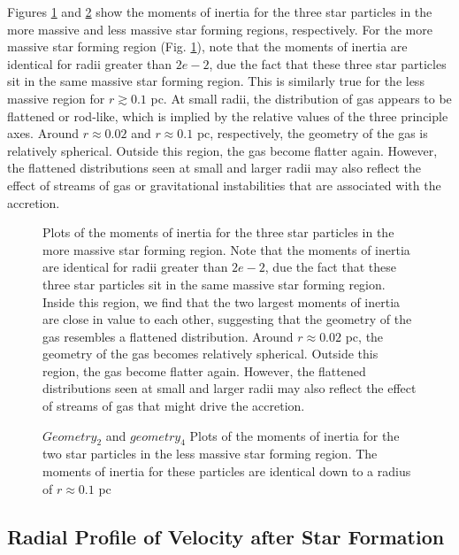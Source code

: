 \documentclass{emulateapj}
\begin{document}
Figures \ref{fig:geometry} and \ref{fig:geometry 2} show the moments of inertia for the three star particles in the more massive and less massive star forming regions, respectively.  For the more massive star forming region (Fig. \ref{fig:geometry}), note that the moments of inertia are identical for radii greater than $2e-2$, due the fact that these three star particles sit in the same massive star forming region. This is similarly true for the less massive region for $r\gtrsim 0.1$ pc.  At small radii, the distribution of gas appears to be flattened or rod-like, which is implied by the relative values of the three principle axes.  Around $r\approx 0.02$ and $r \approx 0.1$ pc, respectively, the geometry of the gas is relatively spherical.  Outside this region, the gas become flatter again. However, the flattened distributions seen at small and larger radii may also reflect the effect of streams of gas or gravitational instabilities that are associated with the accretion. 

\begin{figure}
\caption{Plots of the moments of inertia for the three star particles in the more massive star forming region.  Note that the moments of inertia are identical for radii greater than $2e-2$, due the fact that these three star particles sit in the same massive star forming region.  Inside this region, we find that the two largest moments of inertia are close in value to each other, suggesting that the geometry of the gas resembles a flattened distribution. Around $r\approx 0.02$ pc, the geometry of the gas becomes relatively spherical.  Outside this region, the gas become flatter again. However, the flattened distributions seen at small and larger radii may also reflect the effect of streams of gas that might drive the accretion. 
\label{fig:geometry}}
\end{figure}

\begin{figure}
\caption{$Geometry_2$ and $geometry_4$ Plots of the moments of inertia for the two star particles in the less massive star forming region.  The moments of inertia for these particles are identical down to a radius of $r\approx 0.1$ pc
\label{fig:geometry 2}}
\end{figure}


\subsection{Radial Profile of Velocity after Star Formation}
\end{document}
